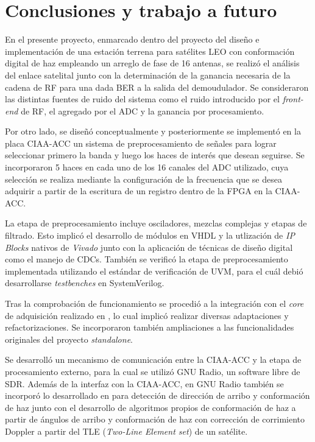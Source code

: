 \documentclass[../../main.tex]{subfiles}
\begin{document}
\graphicspath{{./figures}}
\chapter{Conclusiones y trabajo a futuro}


En el presente proyecto, enmarcado dentro del proyecto del diseño e implementación de una estación terrena para satélites LEO con conformación digital de haz empleando un arreglo de fase de 16 antenas, se realizó el análisis del enlace satelital junto con la determinación de la ganancia necesaria de la cadena de RF para una dada BER a la salida del demoudulador. Se consideraron las distintas fuentes de ruido del sistema como el ruido introducido por el \textit{front-end} de RF, el agregado por el ADC y la ganancia por procesamiento.

Por otro lado, se diseñó conceptualmente y posteriormente se implementó en la placa CIAA-ACC un sistema de preprocesamiento de señales para lograr seleccionar primero la banda y luego los haces de interés que desean seguirse. Se incorporaron 5 haces en cada uno de los 16 canales del ADC utilizado, cuya selección se realiza mediante la configuración de la frecuencia que se desea adquirir a partir de la escritura de un registro dentro de la FPGA en la CIAA-ACC.

La etapa de preprocesamiento incluye osciladores, mezclas complejas y etapas de filtrado. Esto implicó el desarrollo de módulos en VHDL y la utlización de \textit{IP Blocks} nativos de \textit{Vivado} junto con la aplicación de técnicas de diseño digital como el manejo de CDCs. También se verificó la etapa de preprocesamiento implementada utilizando el estándar de verificación de UVM, para el cuál debió desarrollarse \textit{testbenches} en SystemVerilog.

Tras la comprobación de funcionamiento se procedió a la integración con el \textit{core} de adquisición realizado en \cite{proyecto-jose}, lo cual implicó realizar diversas adaptaciones y refactorizaciones. Se incorporaron también ampliaciones a las funcionalidades originales del proyecto \textit{standalone}.

Se desarrolló un mecanismo de comunicación entre la CIAA-ACC y la etapa de procesamiento externo, para la cual se utilizó GNU Radio, un software libre de SDR. Además de la interfaz con la CIAA-ACC, en GNU Radio también se incorporó lo desarrollado en \cite{proyecto-grigo} para detección de dirección de arribo y conformación de haz junto con el desarrollo de algoritmos propios de conformación de haz a partir de ángulos de arribo y conformación de haz con corrección de corrimiento Doppler a partir del TLE (\textit{Two-Line Element set}) de un satélite.
\end{document}
